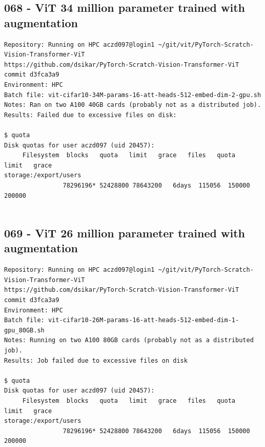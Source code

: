 \subsection{068 - ViT 34 million parameter trained with augmentation}
\label{app_res:068}
\begin{verbatim}
Repository: Running on HPC aczd097@login1 ~/git/vit/PyTorch-Scratch-Vision-Transformer-ViT
https://github.com/dsikar/PyTorch-Scratch-Vision-Transformer-ViT
commit d3fca3a9
Environment: HPC
Batch file: vit-cifar10-34M-params-16-att-heads-512-embed-dim-2-gpu.sh
Notes: Ran on two A100 40GB cards (probably not as a distributed job).
Results: Failed due to excessive files on disk:

$ quota
Disk quotas for user aczd097 (uid 20457): 
     Filesystem  blocks   quota   limit   grace   files   quota   limit   grace
storage:/export/users
                78296196* 52428800 78643200   6days  115056  150000  200000
        
\end{verbatim}

\subsection{069 - ViT 26 million parameter trained with augmentation}
\label{app_res:069}
\begin{verbatim}
Repository: Running on HPC aczd097@login1 ~/git/vit/PyTorch-Scratch-Vision-Transformer-ViT
https://github.com/dsikar/PyTorch-Scratch-Vision-Transformer-ViT
commit d3fca3a9
Environment: HPC
Batch file: vit-cifar10-26M-params-16-att-heads-512-embed-dim-1-gpu_80GB.sh
Notes: Running on two A100 80GB cards (probably not as a distributed job).
Results: Job failed due to excessive files on disk

$ quota
Disk quotas for user aczd097 (uid 20457): 
     Filesystem  blocks   quota   limit   grace   files   quota   limit   grace
storage:/export/users
                78296196* 52428800 78643200   6days  115056  150000  200000
        
\end{verbatim}

